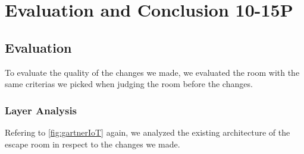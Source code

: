 
\chapter{Evaluation and Conclusion 10-15P} %

\label{Chapter5} %

\section{Evaluation}


To evaluate the quality of the changes we made, 
we evaluated the room with the same criterias we picked when judging the room before the changes.

\subsection{Layer Analysis}
Refering to \ref{fig:gartnerIoT} again, we analyzed the existing architecture of the escape room in respect to the changes we made.
